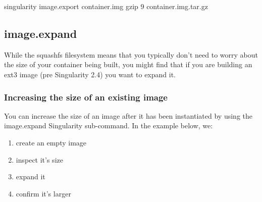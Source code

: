 \documentclass[letterpaper,10pt,english]{sphinxmanual}
\begin{document}
%
\begin{sphinxVerbatim}[commandchars=\\\{\}]
singularity image.export container.img \textbar{} gzip \PYGZhy{}9 \PYGZgt{} container.img.tar.gz
\end{sphinxVerbatim}


\subsection{image.expand}
\label{\detokenize{appendix:image-expand}}\label{\detokenize{appendix:id39}}\label{\detokenize{appendix:sec-imageexpand}}
While the squashfs filesystem means that you typically don’t need to
worry about the size of your container being built, you might find that
if you are building an ext3 image (pre Singularity 2.4) you want to
expand it.


\subsubsection{Increasing the size of an existing image}
\label{\detokenize{appendix:increasing-the-size-of-an-existing-image}}
You can increase the size of an image after it has been instantiated
by using the image.expand Singularity sub-command. In the example
below, we:
\begin{enumerate}
\item {} 
create an empty image

\item {} 
inspect it’s size

\item {} 
expand it

\item {} 
confirm it’s larger

\end{enumerate}
\end{document}
